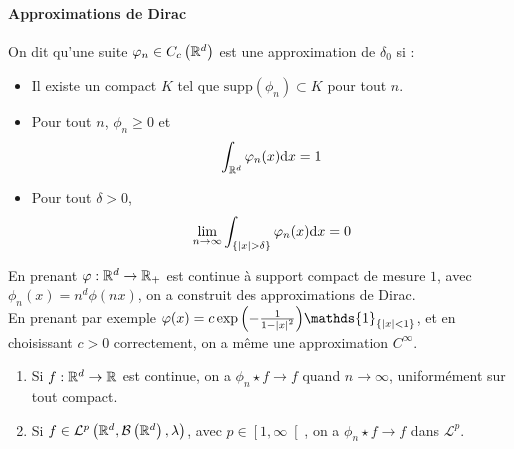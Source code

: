 \documentclass{cours}
\begin{document}
        \paragraph{Approximations de Dirac}
        \begin{definition}
            On dit qu'une suite $\varphi_{n}\in C_{c}\left(\mathbb{R}^{d}\right)$ est une approximation de $\delta_{0}$ si :
            \begin{itemize}
                \item Il existe un compact $K$ tel que $\text{supp}(\phi_{n}) \subset K$ pour tout $n$.
                \item Pour tout $n$, $\phi_{n} \geq 0$ et \[\int_{\mathbb{R}^{d}} \varphi_{n}(x) \mathrm{d}x = 1\]
                \item Pour tout $\delta > 0$, 
                \[\lim_{n\to\infty}\int_{\left\{\left|x\right| > \delta\right\}} \varphi_{n}(x)\mathrm{d}x = 0\]
            \end{itemize}
        \end{definition}
        \begin{proposition}
            En prenant $\varphi : \mathbb{R}^{d} \rightarrow \mathbb{R}_{+}$ est continue à support compact de mesure $1$, avec $\phi_{n}(x) = n^{d}\phi(nx)$, on a construit des approximations de Dirac.\\
            En prenant par exemple $\phi(x) = c \exp{\left(-\frac{1}{1 - \abs{x}^{2}}\right)}\mathds{1}_{\left\{\abs{x} < 1\right\}}$, et en choisissant $c > 0$ correctement, on a même une approximation $C^{\infty}$.
        \end{proposition}

        \begin{proposition}
            \begin{enumerate}
                \item Si $f : \mathbb{R}^{d} \rightarrow \mathbb{R}$ est continue, on a $\phi_{n}\star f \rightarrow f$ quand $n \to \infty$, uniformément sur tout compact.
                \item Si $f \in \mathcal{L}^{p}\left(\mathbb{R}^{d}, \mathcal{B}\left(\mathbb{R}^{d}\right),\lambda\right)$, avec $p \in \left[1, \infty\right[$, on a $\phi_{n} \star f \to f$ dans $\mathcal{L}^{p}$.
            \end{enumerate}
        \end{proposition}
\end{document}
